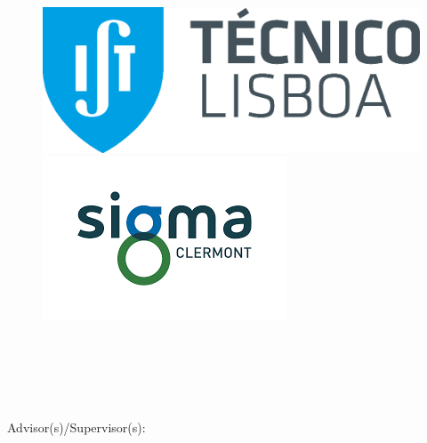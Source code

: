 
\begin{titlepage}
\begin{figure}[!h]
\centering
\includegraphics[width=0.55\linewidth]{images/ist_logo}
\includegraphics[width=0.42\linewidth]{images/download.png}\\[1.50cm]
\end{figure}

\begin{center}
{\LARGE \textbf{\Title}}\\[1.0cm]
{\Large \Subtitle}\\[4.0cm]
{\Large \textbf{\StudentName}}\\[1.0cm]
{\LARGE \textbf{\DegreeName}}\\[3.0cm]

\begin{minipage}[t]{.5\textwidth}
  \begin{flushright}
    {\large Advisor(s)/Supervisor(s):\:}
  \end{flushright}
\end{minipage}%
\begin{minipage}[t]{.5\textwidth}
  \begin{flushleft}
    {\Supervisors}
  \end{flushleft}
\end{minipage}\\[5.0cm]


\end{center}
\end{titlepage}
